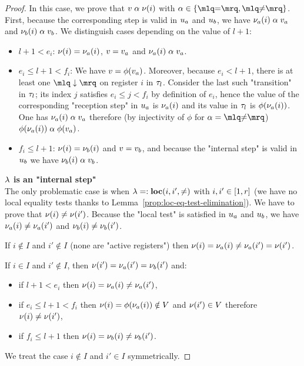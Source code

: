 \begin{proof}
	In this case, we prove that $v \mathrel{\alpha} \nu(i)$ with $\anact \in \set{\quotemarks{\eqtestact}, \quotemarks{\diseqtestact}}$. First, because the corresponding step is valid in $u_a$ and $u_b$, we have $\nu_a(i) \mathrel{\alpha} v_a$ and $\nu_b(i) \mathrel{\alpha} v_b$. We distinguish cases depending on the value of $l+1$:
	\begin{itemize}
		\item $l+1<e_i$: $\nu(i)= \nu_a(i)$, $v = v_a$ and $\nu_a(i) \mathrel{\alpha} v_a$. 
		\item $e_i \leq l+1 < f_i$: We have $v = \phi(v_a)$. 
		Moreover, because $e_i < l+1$, there is at least one $\quotemarks{\enregact}$ on register $i$ in $\tau_l$. Consider the last such "transition" in $\tau_l$; its index $j$ satisfies $e_i \leq j < f_i$ by definition of $e_i$, hence the value of the corresponding "reception step" in $u_a$ is $\nu_a(i)$ and its value in $\tau_{l}$ is $\phi(\nu_a(i))$. One has $\nu_a(i) \mathrel{\alpha} v_a$ therefore (by injectivity of $\phi$ for $\anact = \quotemarks{\diseqtestact}$)
		$\phi(\nu_a(i)) \mathrel{\alpha} \phi(v_a)$.
		\item$f_i \leq l+1$: $\nu(i)= \nu_b(i)$ and $v = v_b$, and because the "internal step" is valid in $u_b$ we have $\nu_b(i) \mathrel{\alpha} v_b$. 
	\end{itemize}
	
	\noindent \textbf{$\lambda$ is an "internal step"} \\
	The only problematic case is when $\lambda =: \textbf{loc}(i,i',{\ne})$ with $i,i' \in [1,r]$ (we have no local equality tests thanks to Lemma~\ref{prop:loc-eq-test-elimination}). We have to prove that $\nu(i) \ne \nu(i')$. 
	Because the "local test" is satisfied in $u_a$ and $u_b$, we have $\nu_a(i) \ne \nu_a(i')$ and $\nu_b(i) \ne \nu_b(i')$.
	
	If $i \notin I$ and $i' \notin I$ (none are "active registers") then  $\nu(i) = \nu_a(i) \ne \nu_a(i') = \nu(i')$.
	
	If $i \in I$ and $i' \notin I$, then $\nu(i') = \nu_a(i') = \nu_b(i')$ and:
	\begin{itemize}
		\item if $l+1<e_i$ then $\nu(i) = \nu_a(i) \ne \nu_a(i')$,
		\item if $e_i \leq l+1 < f_i$ then $\nu(i) = \phi(\nu_a(i)) \notin V$ and  $\nu(i') \in V$ therefore $\nu(i) \ne \nu(i')$,
		\item if $f_i \leq l+1$ then $\nu(i) = \nu_b(i) \ne \nu_b(i')$.
	\end{itemize}
	We treat the case $i \notin I$ and $i' \in I$ symmetrically.
	

\end{proof}
